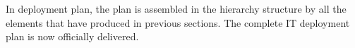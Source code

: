 In deployment plan, the plan is assembled in the hierarchy structure by all the elements that have produced in previous sections. The complete IT deployment plan is now officially delivered.

